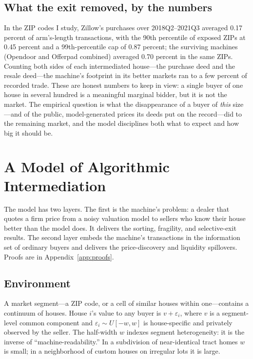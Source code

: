 \documentclass[12pt, letterpaper]{article}
\theoremstyle{remark}
\begin{document}
\subsection{What the exit removed, by the numbers}\label{sec:inst-magnitudes}

In the ZIP codes I study, Zillow's purchases over 2018Q2--2021Q3 averaged 0.17 percent of arm's-length transactions, with the 90th percentile of exposed ZIPs at 0.45 percent and a 99th-percentile cap of 0.87 percent; the surviving machines (Opendoor and Offerpad combined) averaged 0.70 percent in the same ZIPs. Counting both sides of each intermediated house---the purchase deed and the resale deed---the machine's footprint in its better markets ran to a few percent of recorded trade. These are honest numbers to keep in view: a single buyer of one house in several hundred is a meaningful marginal bidder, but it is not the market. The empirical question is what the disappearance of a buyer of \emph{this} size---and of the public, model-generated prices its deeds put on the record---did to the remaining market, and the model disciplines both what to expect and how big it should be.

\section{A Model of Algorithmic Intermediation}\label{sec:model}

The model has two layers. The first is the machine's problem: a dealer that quotes a firm price from a noisy valuation model to sellers who know their house better than the model does. It delivers the sorting, fragility, and selective-exit results. The second layer embeds the machine's transactions in the information set of ordinary buyers and delivers the price-discovery and liquidity spillovers. Proofs are in Appendix~\ref{app:proofs}.

\subsection{Environment}\label{sec:model-env}

A market segment---a ZIP code, or a cell of similar houses within one---contains a continuum of houses. House $i$'s value to any buyer is $v + \varepsilon_i$, where $v$ is a segment-level common component and $\varepsilon_i \sim U[-w, w]$ is house-specific and privately observed by the seller. The half-width $w$ indexes segment heterogeneity: it is the inverse of ``machine-readability.'' In a subdivision of near-identical tract homes $w$ is small; in a neighborhood of custom houses on irregular lots it is large.
\end{document}
